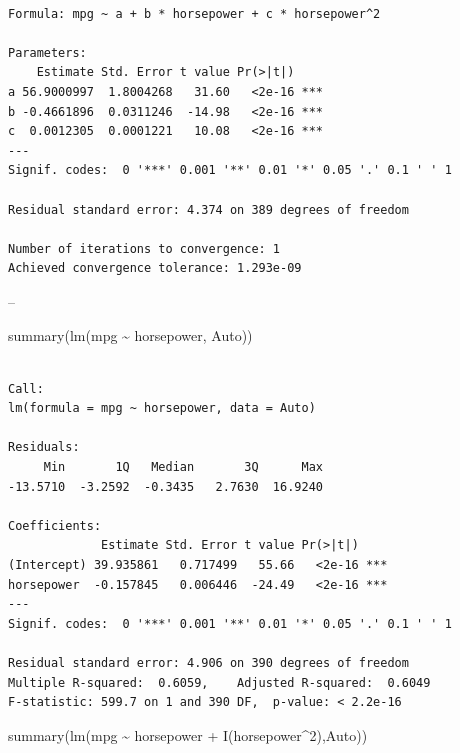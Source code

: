 \documentclass[
  letterpaper,
  DIV=11,
  numbers=noendperiod]{scrreprt}
\newenvironment{Shaded}{\begin{snugshade}}{\end{snugshade}}
\newcommand{\DecValTok}[1]{\textcolor[rgb]{0.47,0.16,0.63}{#1}}
\newcommand{\FunctionTok}[1]{\textcolor[rgb]{0.02,0.16,0.49}{#1}}
\newcommand{\NormalTok}[1]{\textcolor[rgb]{0.33,0.33,0.33}{#1}}
\newcommand{\SpecialCharTok}[1]{\textcolor[rgb]{0.00,0.46,0.62}{#1}}
\begin{document}
\begin{verbatim}

Formula: mpg ~ a + b * horsepower + c * horsepower^2

Parameters:
    Estimate Std. Error t value Pr(>|t|)    
a 56.9000997  1.8004268   31.60   <2e-16 ***
b -0.4661896  0.0311246  -14.98   <2e-16 ***
c  0.0012305  0.0001221   10.08   <2e-16 ***
---
Signif. codes:  0 '***' 0.001 '**' 0.01 '*' 0.05 '.' 0.1 ' ' 1

Residual standard error: 4.374 on 389 degrees of freedom

Number of iterations to convergence: 1 
Achieved convergence tolerance: 1.293e-09
\end{verbatim}

--

\begin{Shaded}
\begin{Highlighting}[]
\FunctionTok{summary}\NormalTok{(}\FunctionTok{lm}\NormalTok{(mpg }\SpecialCharTok{\textasciitilde{}}\NormalTok{ horsepower, Auto))}
\end{Highlighting}
\end{Shaded}

\begin{verbatim}

Call:
lm(formula = mpg ~ horsepower, data = Auto)

Residuals:
     Min       1Q   Median       3Q      Max 
-13.5710  -3.2592  -0.3435   2.7630  16.9240 

Coefficients:
             Estimate Std. Error t value Pr(>|t|)    
(Intercept) 39.935861   0.717499   55.66   <2e-16 ***
horsepower  -0.157845   0.006446  -24.49   <2e-16 ***
---
Signif. codes:  0 '***' 0.001 '**' 0.01 '*' 0.05 '.' 0.1 ' ' 1

Residual standard error: 4.906 on 390 degrees of freedom
Multiple R-squared:  0.6059,    Adjusted R-squared:  0.6049 
F-statistic: 599.7 on 1 and 390 DF,  p-value: < 2.2e-16
\end{verbatim}

\begin{Shaded}
\begin{Highlighting}[]
\FunctionTok{summary}\NormalTok{(}\FunctionTok{lm}\NormalTok{(mpg }\SpecialCharTok{\textasciitilde{}}\NormalTok{ horsepower }\SpecialCharTok{+} \FunctionTok{I}\NormalTok{(horsepower}\SpecialCharTok{\^{}}\DecValTok{2}\NormalTok{),Auto))}
\end{Highlighting}
\end{Shaded}
\end{document}
